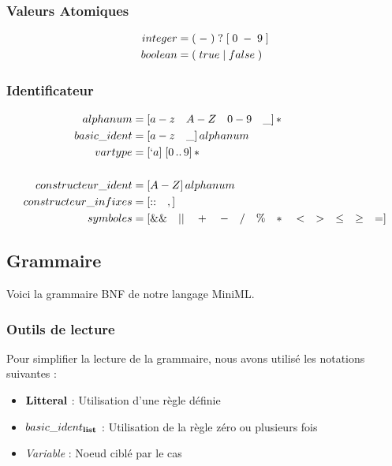 \documentclass[
  12pt,
]{article}
\providecommand{\tightlist}{%
  \setlength{\itemsep}{0pt}\setlength{\parskip}{0pt}}
\begin{document}
\hypertarget{valeurs-atomiques}{%
  \subsubsection{Valeurs Atomiques}\label{valeurs-atomiques}}

\begin{align*}
  integer & = (\;-\;)\;?\;[\;0\;-\;9\;]\* \\
  boolean & = (\;true\;|\;false\;)
\end{align*}

\hypertarget{identificateur}{%
  \subsubsection{Identificateur}\label{identificateur}}

\begin{align*}
  alphanum              & = [a-z \quad A-Z \quad 0-9 \quad \_]\,* \\
  basic\_ident          & = [a-z \quad \_] \, alphanum            \\
  vartype               & = [`a] \; [0 \, .. \, 9]\,*\            \\
  \\
  constructeur\_ident   & = [A-Z] \, alphanum                     \\
  constructeur\_infixes & = [:: \quad ,]                          \\
 symboles                &= [\&\& \quad || \quad + \quad - \quad / \quad \% \quad * \quad < \quad > \quad \leq \quad \geq \quad = ]
\end{align*}

\pagebreak

\hypertarget{grammaire}{%
  \subsection{Grammaire}\label{grammaire}}

Voici la grammaire BNF de notre langage MiniML.

\hypertarget{outils-de-lecture}{%
  \subsubsection{Outils de lecture}\label{outils-de-lecture}}

Pour simplifier la lecture de la grammaire, nous avons utilisé les
notations suivantes :

\begin{itemize}
  \tightlist
  \item
        \(\bf{Litteral}\) : Utilisation d'une règle définie
  \item
        \(basic\_ident_{\bf{list}}\) : Utilisation de la règle zéro ou
        plusieurs fois
  \item
        \textit{Variable} : Noeud ciblé par le cas
\end{itemize}
\end{document}
